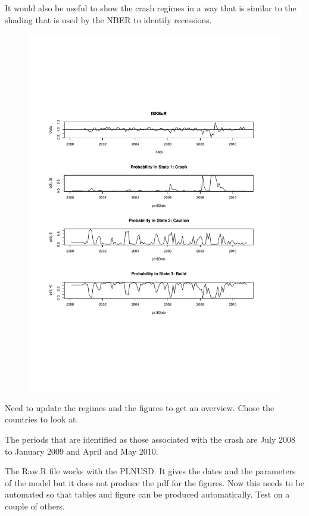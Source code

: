 \documentclass[12pt, a4paper, oneside]{article} %
\begin{document}
It would also be useful to show the crash regimes in a way that is similar to the shading that is used by the NBER to identify recessions.   

 
\begin{figure}
\centering
\includegraphics[scale = .80]{../Figures/ISKEUR.pdf}
\end{figure}

Need to update the regimes and the figures to get an overview.  Chose the countries to look at. 

The periods that are identified as those associated with the crash are July 2008 to January 2009 and April and May 2010.  

The Raw.R file works with the PLNUSD.  It gives the dates and the parameters of the model but it does not produce the pdf for the figures. Now this needs to be automated so that tables and figure can be produced automatically. Test on a couple of others. 
\end{document}
